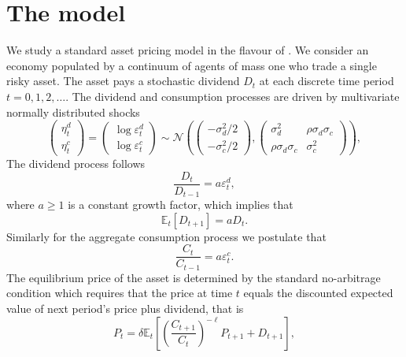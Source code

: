 \section{The model}\label{sec:model}


We study a standard \cite{Lucas1978} asset pricing model in the flavour of \cite{Adam2016}.
We consider an economy populated by a continuum of agents of mass one who trade a single risky asset.
The asset pays a stochastic dividend $D_t$ at each discrete time period $t = 0,1,2,\ldots$.
The dividend and consumption processes are driven by multivariate normally distributed shocks
\begin{equation}
    \begin{pmatrix}
    \eta^d_t \\
    \eta^c_t
    \end{pmatrix} 
    =
    \begin{pmatrix}
    \log \varepsilon^d_t \\
    \log \varepsilon^c_t
    \end{pmatrix} \sim \mathcal{N}\left(\begin{pmatrix}
    -\sigma^2_d/2 \\
    -\sigma^2_c/2
    \end{pmatrix}, \begin{pmatrix}
    \sigma^2_d & \rho \sigma_d \sigma_c \\
    \rho \sigma_d \sigma_c & \sigma^2_c
    \end{pmatrix}\right),
\end{equation}
The dividend process follows 
\begin{equation}
    \frac{D_t}{D_{t-1}} = a \varepsilon^d_t,
\end{equation}
where $a \geq 1$ is a constant growth factor, which implies that
\begin{equation}
    \mathbb{E}_t\left[{D_{t+1}}\right] = a D_t.
\end{equation}
Similarly for the aggregate consumption process we postulate that
\begin{equation}
    \frac{C_t}{C_{t-1}} = a \varepsilon^c_t.
\end{equation}
The equilibrium price of the asset is determined by the standard no-arbitrage condition which requires that the price at time $t$ equals the discounted expected value of next period's price plus dividend, that is
\begin{equation}\label{eq:equilibrium_price}
    P_t = \delta \mathbb{E}_t \left[{ \left(\frac{C_{t+1}}{C_t}\right)^{- \ell} P_{t+1} + D_{t+1}}\right],
\end{equation}
